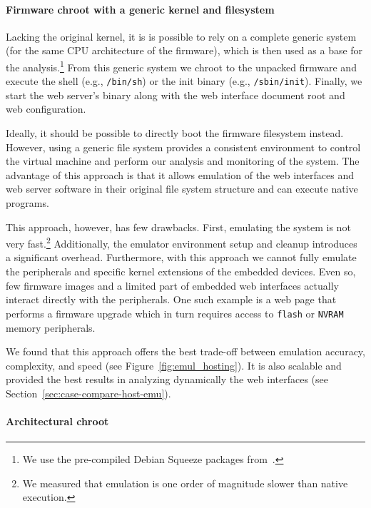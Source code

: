 \documentclass[conference]{./templates/ndss/IEEEtran}
\newcounter{t0d0_counter}
\newcounter{pr00f_counter}
\begin{document}
 



\paragraph{Firmware chroot with a generic kernel and filesystem}

Lacking the original kernel, it is is possible to rely on a complete
generic system (for the same CPU architecture of the firmware), which
is then used as a base for the analysis.\footnote{We use the pre-compiled Debian Squeeze packages from~\cite{aurel32qemu}.}
From this generic system
we chroot to the unpacked firmware and execute the shell (e.g.,
\texttt{/bin/sh}) or the init binary (e.g., \texttt{/sbin/init}).
Finally, we start the web server's binary along with the web interface
document root and web configuration.

Ideally, it should be possible to directly boot the firmware filesystem 
instead. However, using a generic file system provides a consistent
environment to control the virtual machine and perform our analysis and monitoring
of the system.
The advantage of this approach is that it allows emulation of the web
interfaces and web server software in their original file system
structure and can execute native programs.

This approach, however, has few drawbacks. First, emulating the system is not very
fast.\footnote{We measured that emulation is one order of magnitude
  slower than native execution.} Additionally, the emulator
environment setup and cleanup introduces a significant overhead. 
Furthermore, with this approach we cannot fully emulate the
peripherals and specific kernel extensions of the embedded
devices. Even so, few firmware images and a limited part of embedded
web interfaces actually interact directly with the peripherals. One
such example is a web page that performs a firmware upgrade which in
turn requires access to \texttt{flash} or \texttt{NVRAM} memory
peripherals.

We found that this approach offers the best trade-off between emulation
accuracy, complexity, and speed (see Figure~\ref{fig:emul_hosting}). It
is also scalable and provided the best results in analyzing dynamically the web 
interfaces (see Section~\ref{sec:case-compare-host-emu}). 

\paragraph{Architectural chroot}
\label{sec:arch-chroot}
\end{document}
